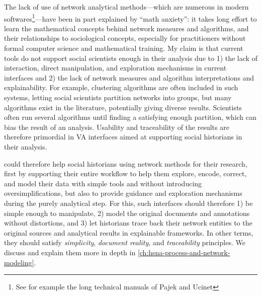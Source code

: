 The lack of use of network analytical methods---which are numerous in modern \sna softwares\footnote{See for example the long technical manuals of Pajek\cite{pajek} and Ucinet\cite{johnsonUCINETSoftwareTool1987}}---have been in part explained by ``math anxiety''\cite{paxtonDollarsSenseConvincing2006}: it takes long effort to learn the mathematical concepts behind network measures and algorithms, and their relationships to sociological concepts\cite{rollingerProlegomenaProblemsPerspectives2020}, especially for practitioners without formal computer science and mathematical training.
My claim is that current \hsna tools do not support social scientists enough in their analysis due to 1) the lack of interaction, direct manipulation, and exploration mechanisms in current interfaces and 2) the lack of network measures and algorithm interpretations and explainability.
For example, clustering algorithms are often included in such systems, letting social scientists partition networks into groups, but many algorithms exist in the literature, potentially giving diverse results.
Scientists often run several algorithms until finding a satisfying enough partition, which can bias the result of an analysis\cite{pisterIntegratingPriorKnowledge2021}.
Usability and traceability of the results are therefore primordial in VA interfaces aimed at supporting social historians in their analysis.

\va could therefore help social historians using network methods for their research, first by supporting their entire workflow to help them explore, encode, correct, and model their data with simple tools and without introducing oversimplifications, but also to provide guidance and exploration mechanisms during the purely analytical step.
For this, such interfaces should therefore 1) be simple enough to manipulate, 2) model the original documents and annotations without distortions, and 3) let historians trace back their network entities to the original sources and analytical results in explainable frameworks.
In other terms, they should satisfy \emph{simplicity}, \emph{document reality}, and \emph{traceability} principles.
We discuss and explain them more in depth in \autoref{ch:hsna-process-and-network-modeling}.





